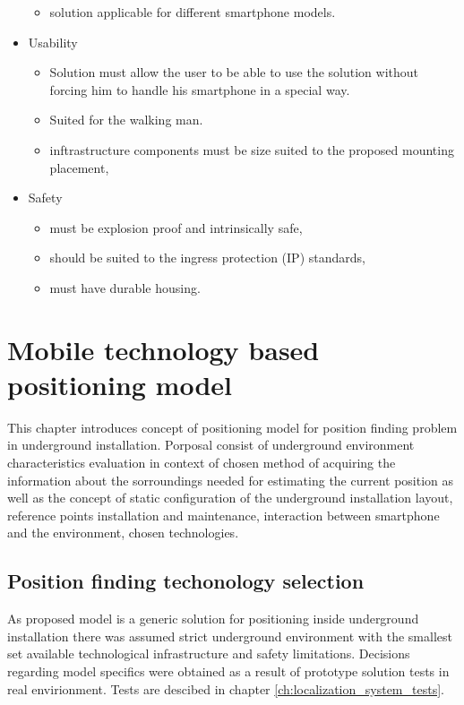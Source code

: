 \documentclass[../main.tex]{subfiles}
\begin{document}
\begin{itemize}
\begin{itemize}
		\item solution applicable for different smartphone models.
	\end{itemize}
	\item Usability
	\begin{itemize}
		\item Solution must allow the user to be able to use the solution without forcing him to handle his smartphone in a special way.
		\item Suited for the walking man.
		\item inftrastructure components must be size suited to the proposed mounting placement,
	\end{itemize}
	\item Safety
	\begin{itemize}
		\item must be explosion proof and intrinsically safe,
		\item should be suited to the ingress protection (IP) standards,
		\item must have durable housing.
	\end{itemize}
\end{itemize}



\chapter{Mobile technology based positioning model}
This chapter introduces concept of positioning model for position finding problem in underground installation. Porposal consist of underground environment characteristics evaluation in context of chosen method of acquiring the information about the sorroundings needed for estimating the current position as well as the concept of static configuration of the underground installation layout, reference points installation and maintenance, interaction between smartphone and the environment, chosen technologies.

\section{Position finding techonology selection} %
\label{sec:position_finding_requirements}

As proposed model is a generic solution for positioning inside underground installation there was assumed strict underground environment with the smallest set available technological infrastructure and safety limitations. Decisions regarding model specifics were obtained as a result of prototype solution tests in real envirionment. Tests are descibed in chapter \ref{ch:localization_system_tests}.
\end{document}
